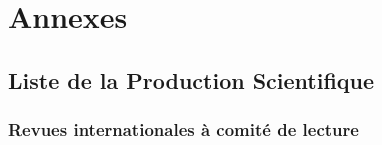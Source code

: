 \documentclass[
  11pt,
]{article}
\begin{document}
\appendix

\hypertarget{annexes}{%
\section*{Annexes}\label{annexes}}

\renewcommand{\thesection}{\Alph{section}}

\hypertarget{articles}{%
\subsection{Liste de la Production Scientifique}\label{articles}}

\hypertarget{revues-internationales-uxe0-comituxe9-de-lecture}{%
\subsubsection{Revues internationales à comité de
lecture}\label{revues-internationales-uxe0-comituxe9-de-lecture}}
\end{document}
